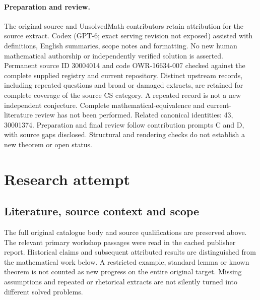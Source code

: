 \documentclass[11pt]{article}
\begin{document}
\paragraph{Preparation and review.}
The original source and UnsolvedMath contributors retain attribution for the source extract. Codex (GPT-6; exact serving revision not exposed) assisted with definitions, English summaries, scope notes and formatting. No new human mathematical authorship or independently verified solution is asserted. Permanent source ID 30004014 and code OWR-16634-007 checked against the complete supplied registry and current repository. Distinct upstream records, including repeated questions and broad or damaged extracts, are retained for complete coverage of the source CS category. A repeated record is not a new independent conjecture. Complete mathematical-equivalence and current-literature review has not been performed. Related canonical identities: 43, 30001374. Preparation and final review follow contribution prompts C and D, with source gaps disclosed. Structural and rendering checks do not establish a new theorem or open status.
\label{end:30004014}

\section{Research attempt}
\subsection{Literature, source context and scope}
The full original catalogue body and source qualifications are preserved above. The relevant primary workshop passages were read in the cached publisher report. Historical claims and subsequent attributed results are distinguished from the mathematical work below. A restricted example, standard lemma or known theorem is not counted as new progress on the entire original target. Missing assumptions and repeated or rhetorical extracts are not silently turned into different solved problems.
\end{document}
